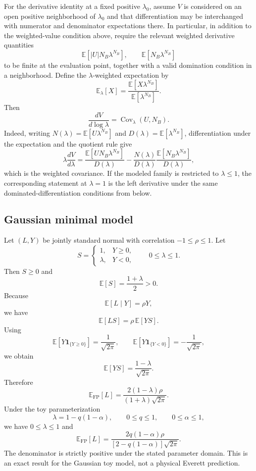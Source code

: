 For the derivative identity at a fixed positive $\lambda_0$, assume $V$ is considered on an open positive neighborhood of $\lambda_0$ and that differentiation may be interchanged with numerator and denominator expectations there. In particular, in addition to the weighted-value condition above, require the relevant weighted derivative quantities
\[
\mathbb E[|U|N_B\lambda^{N_B}],
\qquad
\mathbb E[N_B\lambda^{N_B}]
\]
to be finite at the evaluation point, together with a valid domination condition in a neighborhood. Define the $\lambda$-weighted expectation by
\[
\mathbb E_\lambda[X]
=
\frac{\mathbb E[X\lambda^{N_B}]}{\mathbb E[\lambda^{N_B}]}.
\]
Then
\[
\frac{dV}{d\log\lambda}
=
\operatorname{Cov}_\lambda(U,N_B).
\]
Indeed, writing $N(\lambda)=\mathbb E[U\lambda^{N_B}]$ and $D(\lambda)=\mathbb E[\lambda^{N_B}]$, differentiation under the expectation and the quotient rule give
\[
\lambda\frac{dV}{d\lambda}
=
\frac{\mathbb E[UN_B\lambda^{N_B}]}{D(\lambda)}
-
\frac{N(\lambda)}{D(\lambda)}
\frac{\mathbb E[N_B\lambda^{N_B}]}{D(\lambda)},
\]
which is the weighted covariance. If the modeled family is restricted to $\lambda\le1$, the corresponding statement at $\lambda=1$ is the left derivative under the same dominated-differentiation conditions from below.

\subsection{Gaussian minimal model}

Let $(L,Y)$ be jointly standard normal with correlation $-1\le\rho\le1$. Let
\[
S
=
\begin{cases}
1, & Y\ge 0,\\
\lambda, & Y<0,
\end{cases}
\qquad
0\le\lambda\le1.
\]
Then $S\ge0$ and
\[
\mathbb E[S]
=
\frac{1+\lambda}{2}>0.
\]
Because
\[
\mathbb E[L\mid Y]=\rho Y,
\]
we have
\[
\mathbb E[LS]
=
\rho\,\mathbb E[YS].
\]
Using
\[
\mathbb E[Y\mathbf 1_{\{Y\ge0\}}]
=
\frac{1}{\sqrt{2\pi}},
\qquad
\mathbb E[Y\mathbf 1_{\{Y<0\}}]
=
-\frac{1}{\sqrt{2\pi}},
\]
we obtain
\[
\mathbb E[YS]
=
\frac{1-\lambda}{\sqrt{2\pi}}.
\]
Therefore
\[
\mathbb E_{\mathrm{FP}}[L]
=
\frac{2(1-\lambda)\rho}{(1+\lambda)\sqrt{2\pi}}.
\]
Under the toy parameterization
\[
\lambda=1-q(1-\alpha),
\qquad
0\le q\le1,
\qquad
0\le\alpha\le1,
\]
we have $0\le\lambda\le1$ and
\[
\mathbb E_{\mathrm{FP}}[L]
=
\frac{2q(1-\alpha)\rho}{[2-q(1-\alpha)]\sqrt{2\pi}}.
\]
The denominator is strictly positive under the stated parameter domain. This is an exact result for the Gaussian toy model, not a physical Everett prediction.

